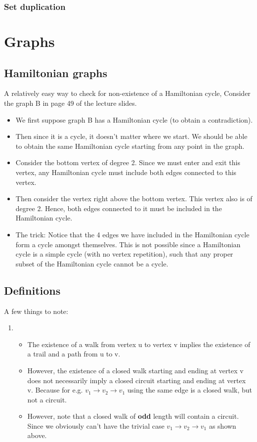 \documentclass{article}
\begin{document}
\subsubsection{Set duplication}

\section{Graphs}
\subsection{Hamiltonian graphs}
A relatively easy way to check for non-existence of a Hamiltonian cycle,
Consider the graph B in page 49 of the lecture slides.
\begin{itemize}
    \item We first suppose graph B has a Hamiltonian cycle (to obtain a contradiction).
    \item Then since it is a cycle, it doesn't matter where we start. We should be able to obtain the same Hamiltonian cycle starting from any point in the graph. 
    \item Consider the bottom vertex of degree 2. Since we must enter and exit this vertex, any Hamiltonian cycle must include both edges connected to this vertex.
    \item Then consider the vertex right above the bottom vertex. This vertex also is of degree 2. Hence, both edges connected to it must be included in the Hamiltonian cycle.
    \item The trick: Notice that the 4 edges we have included in the Hamiltonian cycle form a cycle amongst themselves. This is not possible since a Hamiltonian cycle is a simple cycle (with no vertex repetition), such that any proper subset of the Hamiltonian cycle cannot be a cycle.
\end{itemize}

\subsection{Definitions}
A few things to note:
\begin{enumerate}
	\item \begin{itemize}
		\item The existence of a walk from vertex u to vertex v implies the existence of a trail and a path from u to v. 
		\item However, the existence of a closed walk starting and ending at vertex v does not necessarily imply a closed circuit starting and ending at vertex v. Because for e.g. $v_1 \rightarrow v_2 \rightarrow v_1$ using the same edge is a closed walk, but not a circuit.
		\item However, note that a closed walk of \textbf{odd} length will contain a circuit. Since we obviously can't have the trivial case $v_1 \rightarrow v_2 \rightarrow v_1$ as shown above.
	\end{itemize}
\end{enumerate}
\end{document}
